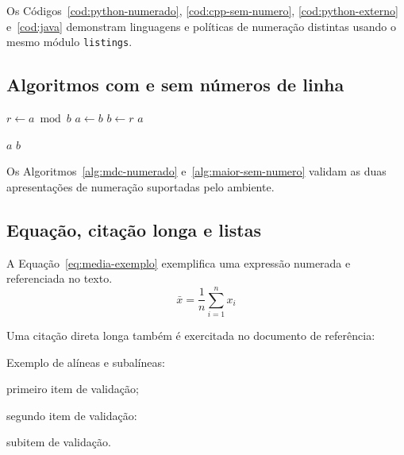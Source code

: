 Os Códigos~\ref{cod:python-numerado}, \ref{cod:cpp-sem-numero}, \ref{cod:python-externo} e~\ref{cod:java} demonstram linguagens e políticas de numeração distintas usando o mesmo módulo \texttt{listings}.

\subsection{Algoritmos com e sem números de linha}

\label{alg:mdc-numerado}
\begin{ufcalgoritmo}[here][1]
    \State $r \gets a \bmod b$
    \State $a \gets b$
    \State $b \gets r$
  \EndWhile
  \State \Return $a$
\end{ufcalgoritmo}

\label{alg:maior-sem-numero}
\begin{ufcalgoritmo}[here][0]
    \State \Return $a$
  \Else
    \State \Return $b$
  \EndIf
\end{ufcalgoritmo}

Os Algoritmos~\ref{alg:mdc-numerado} e~\ref{alg:maior-sem-numero} validam as duas apresentações de numeração suportadas pelo ambiente.

\subsection{Equação, citação longa e listas}

A Equação~\ref{eq:media-exemplo} exemplifica uma expressão numerada e referenciada no texto.
\begin{equation}
  \bar{x} = \frac{1}{n}\sum_{i=1}^{n}x_i
  \label{eq:media-exemplo}
\end{equation}

Uma citação direta longa também é exercitada no documento de referência:


Exemplo de alíneas e subalíneas:

\begin{ufcalineas}
  \item primeiro item de validação;
  \item segundo item de validação:
    \begin{ufcsubalineas}
      \item subitem de validação.
    \end{ufcsubalineas}
\end{ufcalineas}

